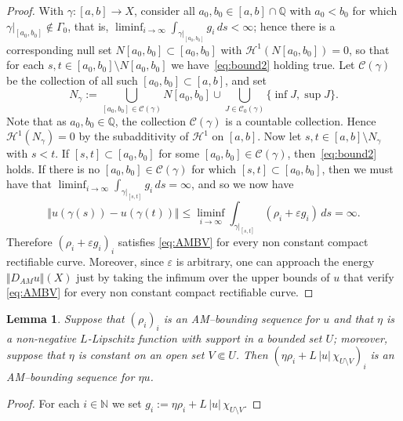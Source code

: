 \documentclass[11pt, letterpaper]{amsart} %
\newcommand*{\N}{{\mathbb N}}
\newcommand*{\Q}{\mathbb{Q}}
\newcommand*{\eps}{\varepsilon}
\numberwithin{equation}{section}
\theoremstyle{plain}
\newtheorem{lemma}[equation]{Lemma}
\theoremstyle{definition}
\begin{document}
{\begin{proof}
With $\gamma:[a,b]\to X$, consider all $a_0,b_0\in[a,b]\cap\Q$ with $a_0<b_0$ for which 
$\gamma\vert_{[a_0,b_0]}\not\in\Gamma_0$, that is,
$\liminf_{i\to\infty}\int_{\gamma\vert_{[a_0,b_0]}}g_i\, ds<\infty$; hence there is a corresponding null set
$N[a_0,b_0]\subset[a_0,b_0]$ with $\mathcal{H}^1(N[a_0,b_0])=0$, so that for each $s,t\in[a_0,b_0]\setminus N[a_0,b_0]$
we have~\eqref{eq:bound2} holding true. 
Let $\mathcal{C}(\gamma)$ be the collection of all such $[a_0,b_0]\subset[a,b]$, and
set 
\[
N_\gamma:=\bigcup_{[a_0,b_0]\in\mathcal{C}(\gamma)}N[a_0,b_0]\cup
  \bigcup_{J\in\mathcal{C}_0(\gamma)}\{\inf J, \sup J\}.
\] 
Note that as $a_0,b_0\in\Q$, the collection
$\mathcal{C}(\gamma)$ is a countable collection. Hence $\mathcal{H}^1(N_\gamma)=0$ by the subadditivity of $\mathcal{H}^1$
on $[a,b]$. Now let $s,t\in[a,b]\setminus N_\gamma$ with $s<t$. If $[s,t]\subset[a_0,b_0]$ for some 
$[a_0,b_0]\in\mathcal{C}(\gamma)$, then~\eqref{eq:bound2} holds. If there is no $[a_0,b_0]\in\mathcal{C}(\gamma)$ for which
$[s,t]\subset[a_0,b_0]$, then we must have that $\liminf_{i\to\infty}\int_{\gamma\vert_{[s,t]}}g_i\, ds=\infty$, and so we now have
\[
\Vert u(\gamma (s))-u(\gamma (t))\Vert \le \liminf_{i\to\infty}\int_{\gamma\vert_{[s,t]}}(\rho_i+\eps g_i)\, ds=\infty.
\] 
Therefore $(\rho_i+\varepsilon g_i)_i$ satisfies \eqref{eq:AMBV} for every non constant compact rectifiable curve. 
Moreover, since $\varepsilon$ is arbitrary, one can approach the energy $\Vert D_{AM}u\Vert (X)$ just by 
taking the infimum over the upper bounds of $u$ that verify \eqref{eq:AMBV} for every non constant compact rectifiable curve.
\end{proof}

\begin{lemma}\label{lem:Leibnitz}
Suppose that $(\rho_i)_i$ is an AM--bounding sequence for $u$ and that $\eta$ is a non-negative $L$-Lipschitz function
with support in a bounded set $U$; moreover, suppose that $\eta$ is constant on an open set $V\Subset U$. Then
$(\eta \rho_i+L\, |u|\, \chi_{U\setminus V})_i$ is an AM--bounding sequence for $\eta u$.
\end{lemma}

\begin{proof}
For each $i\in\N$ we set $g_i:=\eta \rho_i+L\, |u|\, \chi_{U\setminus V}$.


\end{proof}}
\end{document}
